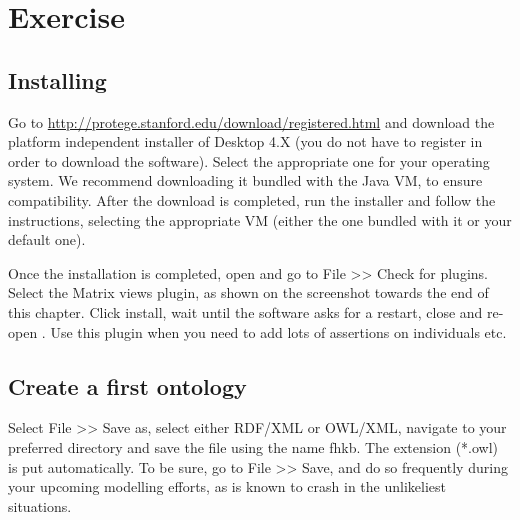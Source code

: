 \chapter{Exercise }
\addtocounter{excounter}{1}


\section{Installing \protege}
Go to \url{http://protege.stanford.edu/download/registered.html} and download the platform independent installer of \protege Desktop 4.X (you do not have to register in order to download the software). Select the appropriate one for your operating system. We recommend downloading it bundled with the Java VM, to ensure compatibility. After the download is completed, run the installer and follow the instructions, selecting the appropriate VM (either the one bundled with it or your default one). 

Once the installation is completed, open \protege and go to File >> Check for plugins. Select the Matrix views plugin, as shown on the screenshot towards the end of this chapter. Click install, wait until the software asks for a restart, close and re-open \protege. Use this plugin when you need to add lots of assertions on individuals etc.

\section{Create a first ontology}
Select File >> Save as, select either RDF/XML or OWL/XML, navigate to your preferred directory and save the file using the name fhkb. The extension (*.owl) is put automatically. To be sure, go to File >> Save, and do so frequently during your upcoming modelling efforts, as \protege is known to crash in the unlikeliest situations.

